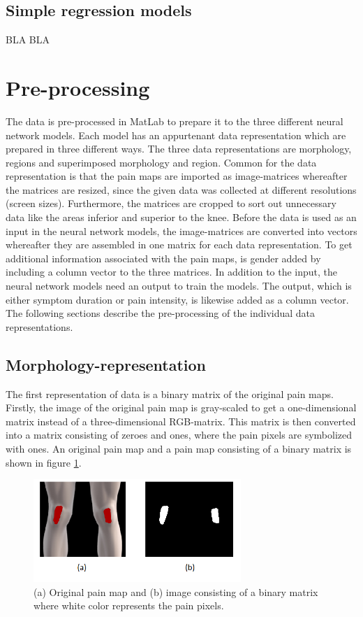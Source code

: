 \subsection{Simple regression models}

BLA BLA



\section{Pre-processing}
The data is pre-processed in MatLab to prepare it to the three different neural network models. Each model has an appurtenant data representation which are prepared in three different ways. The three data representations are morphology, regions and superimposed morphology and region. Common for the data representation is that the pain maps are imported as image-matrices whereafter the matrices are resized, since the given data was collected at different resolutions (screen sizes). Furthermore, the matrices are cropped to sort out unnecessary data like the areas inferior and superior to the knee.
Before the data is used as an input in the neural network models, the image-matrices are converted into vectors whereafter they are assembled in one matrix for each data representation. To get additional information associated with the pain maps, is gender added by including a column vector to the three matrices. 
In addition to the input, the neural network models need an output to train the models. The output, which is either symptom duration or pain intensity, is likewise added as a column vector. 
The following sections describe the pre-processing of the individual data representations. 

\subsection{Morphology-representation} \label{sec:Morph}
The first representation of data is a binary matrix of the original pain maps.
Firstly, the image of the original pain map is gray-scaled to get a one-dimensional matrix instead of a three-dimensional RGB-matrix. This matrix is then converted into a matrix consisting of zeroes and ones, where the pain pixels are symbolized with ones. An original pain map and a pain map consisting of a binary matrix is shown in figure \ref{fig:cropbin7}.

\begin{figure} [H]
\centering
\includegraphics[width=0.7\textwidth]{figures/cropbin7}
\caption{(a) Original pain map and (b) image consisting of a binary matrix where white color represents the pain pixels.}
\label{fig:cropbin7}
\end{figure}

